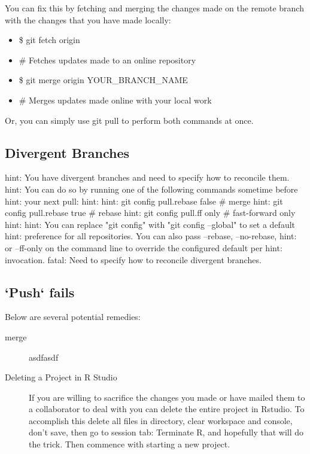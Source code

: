 \documentclass[12pt]{../SOP4_alpha}\usepackage[]{graphicx}\usepackage[]{xcolor}
\begin{document}
\NP You can fix this by fetching and merging the changes made on the remote branch with the changes that you have made locally:
\begin{itemize}
  \item \$ git fetch origin
  \item \# Fetches updates made to an online repository
  \item \$ git merge origin YOUR\_BRANCH\_NAME
  \item \# Merges updates made online with your local work
\end{itemize}

\NP Or, you can simply use git pull to perform both commands at once.

\subsection{Divergent Branches}

hint: You have divergent branches and need to specify how to reconcile them.
hint: You can do so by running one of the following commands sometime before
hint: your next pull:
hint: 
hint:   git config pull.rebase false  # merge
hint:   git config pull.rebase true   # rebase
hint:   git config pull.ff only       # fast-forward only
hint: 
hint: You can replace "git config" with "git config --global" to set a default
hint: preference for all repositories. You can also pass --rebase, --no-rebase,
hint: or --ff-only on the command line to override the configured default per
hint: invocation.
fatal: Need to specify how to reconcile divergent branches.

\subsection{`Push` fails}

\NP Below are several potential remedies:

\begin{description}
  \item[merge] asdfasdf
  
  \item[Deleting a Project in R Studio]If you are willing to sacrifice the changes you made or have mailed them to a collaborator to deal with you can delete the entire project in Rstudio. To accomplish this delete all files in directory, clear workspace and console, don't save, then go to session tab: Terminate R, and hopefully that will do the trick. Then commence with starting a new project. 

\end{description}
\end{document}
